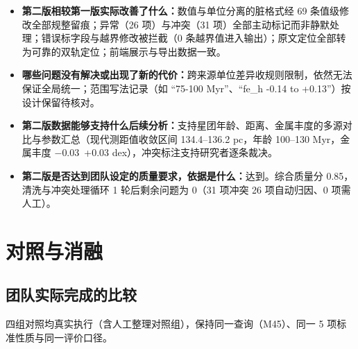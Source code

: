 \begin{itemize}[leftmargin=1.2em,itemsep=2pt]
\item \textbf{第二版相较第一版实际改善了什么：}数值与单位分离的脏格式经 69 条值级修改全部规整留痕；异常（26 项）与冲突（31 项）全部主动标记而非静默处理；错误标字段与越界修改被拦截（0 条越界值进入输出）；原文定位全部转为可靠的双轨定位；前端展示与导出数据一致。
\item \textbf{哪些问题没有解决或出现了新的代价：}跨来源单位差异收规则限制，依然无法保证全局统一；范围写法记录（如 “75-100 Myr”、“fe\_h -0.14 to +0.13”）按设计保留待核对。
\item \textbf{第二版数据能够支持什么后续分析：}支持星团年龄、距离、金属丰度的多源对比与参数汇总（现代测距值收敛区间 134.4--136.2 pc，年龄 100--130 Myr，金属丰度 $-$0.03~+0.03 dex），冲突标注支持研究者逐条裁决。
\item \textbf{第二版是否达到团队设定的质量要求，依据是什么：}达到。综合质量分 0.85，清洗与冲突处理循环 1 轮后剩余问题为 0（31 项冲突 26 项自动归因、0 项需人工）。
\end{itemize}

\section{对照与消融}

\subsection{团队实际完成的比较}

四组对照均真实执行（含人工整理对照组），保持同一查询（M45）、同一 5 项标准性质与同一评价口径。

